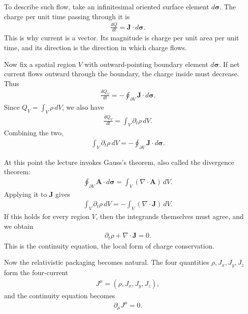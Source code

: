 To describe such flow, take an infinitesimal oriented surface element \(d\boldsymbol{\sigma}\). The charge per unit time passing through it is
\begin{align}
\frac{dQ}{dt} = \mathbf J \cdot d\boldsymbol{\sigma}.
\end{align}
This is why current is a vector. Its magnitude is charge per unit area per unit time, and its direction is the direction in which charge flows.

Now fix a spatial region \(V\) with outward-pointing boundary element \(d\boldsymbol{\sigma}\). If net current flows outward through the boundary, the charge inside must decrease. Thus
\begin{align}
\frac{dQ_V}{dt} = -\oint_{\partial V} \mathbf J \cdot d\boldsymbol{\sigma}.
\end{align}
Since \(Q_V=\int_V \rho\,dV\), we also have
\begin{align}
\frac{dQ_V}{dt} = \int_V \partial_t \rho\,dV.
\end{align}
Combining the two,
\begin{align}
\int_V \partial_t \rho\,dV = -\oint_{\partial V} \mathbf J \cdot d\boldsymbol{\sigma}.
\end{align}

At this point the lecture invokes Gauss's theorem, also called the divergence theorem:
\begin{align}
\oint_{\partial V} \mathbf A \cdot d\boldsymbol{\sigma}
= \int_V (\nabla \cdot \mathbf A)\,dV.
\end{align}
Applying it to \(\mathbf J\) gives
\begin{align}
\int_V \partial_t \rho\,dV
= -\int_V (\nabla \cdot \mathbf J)\,dV.
\end{align}
If this holds for every region \(V\), then the integrands themselves must agree, and we obtain
\begin{align}
\partial_t \rho + \nabla \cdot \mathbf J = 0.
\end{align}
This is the continuity equation, the local form of charge conservation.

Now the relativistic packaging becomes natural. The four quantities \(\rho, J_x, J_y, J_z\) form the four-current
\begin{align}
J^\mu = (\rho, J_x, J_y, J_z),
\end{align}
and the continuity equation becomes
\begin{align}
\partial_\mu J^\mu = 0.
\end{align}

